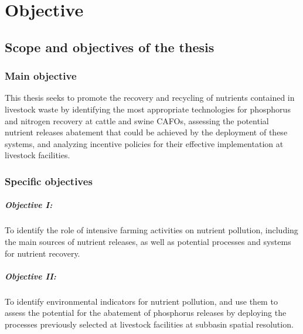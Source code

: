\chapter{Objective}\label{ch:objectives}

\section{Scope and objectives of the thesis}
\subsection{Main objective}
This thesis seeks to promote the recovery and recycling of nutrients contained in livestock waste by identifying the most appropriate technologies for phosphorus and nitrogen recovery at cattle and swine CAFOs, assessing the potential nutrient releases abatement that could be achieved by the deployment of these systems, and analyzing incentive policies for their effective implementation at livestock facilities. 

\subsection{Specific objectives}
\paragraph{Objective I:} To
identify the role of intensive farming activities on nutrient pollution, including the main sources of nutrient releases, as well as potential processes and systems for nutrient recovery.
\paragraph{Objective II:} To identify environmental indicators for nutrient pollution, and use  them to  assess the potential for the abatement of phosphorus releases by deploying the processes previously selected at livestock facilities at subbasin spatial resolution.
